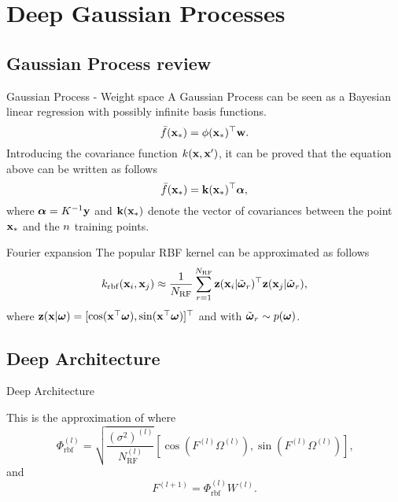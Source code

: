 
\section{Deep Gaussian Processes}
\label{cap:dgp}

\subsection{Gaussian Process review}
\begin{frame}{Gaussian Process - Weight space}
    A Gaussian Process can be seen as a Bayesian linear regression with possibly infinite basis functions.
    \begin{equation}
        \bar f(\mathbf{x}_{*}) = \phi(\mathbf{x}_{*})^\top\mathbf{w}.
    \end{equation}
    \pause
    Introducing the covariance function $k(\mathbf{x}, \mathbf{x}')$, it can be proved that the equation above can be written as follows
    \begin{equation}
        \bar f(\mathbf{x}_{*}) = \mathbf{k}(\mathbf{x}_{*})^\top \boldsymbol{\alpha},
    \end{equation}
    where $\boldsymbol{\alpha} = K^{-1}\mathbf{y}$ and $\mathbf{k}(\mathbf{x}_{*})$ denote the vector of covariances between the point $\mathbf{x}_{*}$ and the $n$ training points.
\end{frame}

\begin{frame}{Fourier expansion}
    The popular RBF kernel can be approximated as follows
    \begin{equation}
        k_{\mathrm{rbf}}(\mathbf{x}_i, \mathbf{x}_j) \approx \frac{1}{N_{\mathrm{RF}}} \sum_{r=1}^{N_{\mathrm{RF}}} \mathbf{z}(\mathbf{x}_i | \tilde{\boldsymbol{\omega}}_r)^{\top} \mathbf{z}(\mathbf{x}_j | \tilde{\boldsymbol{\omega}}_r) \text{,}
    \end{equation}
    where $\mathbf{z}(\mathbf{x} | \boldsymbol{\omega}) = [\cos(\mathbf{x}^{\top} \boldsymbol{\omega}), \sin(\mathbf{x}^{\top} \boldsymbol{\omega})]^{\top}$ and with $\tilde{\boldsymbol{\omega}}_{r} \sim p(\boldsymbol{\omega})$.
\end{frame}

\subsection{Deep Architecture}
\begin{frame}{Deep Architecture}
    
    This is the approximation of \dgp where
    \begin{equation}
        \Phi_{\mathrm{rbf}}^{(l)} = \sqrt{\frac{(\sigma^2)^{(l)}}{N_{\mathrm{RF}}^{(l)}}} \left[ \cos\left(F^{(l)} \Omega^{(l)}\right), \sin\left(F^{(l)} \Omega^{(l)}\right) \right] \text{,}
    \end{equation}
    and
    \begin{equation}
        F^{(l+1)} = \Phi_{\mathrm{rbf}}^{(l)} W^{(l)} \text{.}
    \end{equation}
\end{frame}
